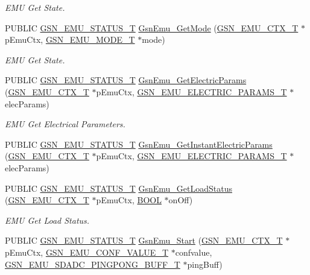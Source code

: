 \begin{DoxyCompactItemize}
\begin{DoxyCompactList}\small\item\em EMU Get State. \end{DoxyCompactList}\item 
PUBLIC \hyperlink{a00490_aeda27e2bd7f74b1b9748e313d272033e}{GSN\_\-EMU\_\-STATUS\_\-T} \hyperlink{a00663_ga04eb7d0e39bd40dc1e3b10be77de73ba}{GsnEmu\_\-GetMode} (\hyperlink{a00059}{GSN\_\-EMU\_\-CTX\_\-T} $\ast$pEmuCtx, \hyperlink{a00663_gafbaa4d30aa4b736f3465344d6a5935b0}{GSN\_\-EMU\_\-MODE\_\-T} $\ast$mode)
\begin{DoxyCompactList}\small\item\em EMU Get State. \end{DoxyCompactList}\item 
PUBLIC \hyperlink{a00490_aeda27e2bd7f74b1b9748e313d272033e}{GSN\_\-EMU\_\-STATUS\_\-T} \hyperlink{a00663_ga95c5ac4e1742d243bfa2722e75a01e73}{GsnEmu\_\-GetElectricParams} (\hyperlink{a00059}{GSN\_\-EMU\_\-CTX\_\-T} $\ast$pEmuCtx, \hyperlink{a00060}{GSN\_\-EMU\_\-ELECTRIC\_\-PARAMS\_\-T} $\ast$elecParams)
\begin{DoxyCompactList}\small\item\em EMU Get Electrical Parameters. \end{DoxyCompactList}\item 
PUBLIC \hyperlink{a00490_aeda27e2bd7f74b1b9748e313d272033e}{GSN\_\-EMU\_\-STATUS\_\-T} \hyperlink{a00489_a5599d53687aa801e24419e74c6a98f7a}{GsnEmu\_\-GetInstantElectricParams} (\hyperlink{a00059}{GSN\_\-EMU\_\-CTX\_\-T} $\ast$pEmuCtx, \hyperlink{a00060}{GSN\_\-EMU\_\-ELECTRIC\_\-PARAMS\_\-T} $\ast$elecParams)
\item 
PUBLIC \hyperlink{a00490_aeda27e2bd7f74b1b9748e313d272033e}{GSN\_\-EMU\_\-STATUS\_\-T} \hyperlink{a00663_ga600b62bce05579cdc2fd7d12b20c65df}{GsnEmu\_\-GetLoadStatus} (\hyperlink{a00059}{GSN\_\-EMU\_\-CTX\_\-T} $\ast$pEmuCtx, \hyperlink{a00660_ga1f04022c0a182c51c059438790ea138c}{BOOL} $\ast$onOff)
\begin{DoxyCompactList}\small\item\em EMU Get Load Status. \end{DoxyCompactList}\item 
PUBLIC \hyperlink{a00490_aeda27e2bd7f74b1b9748e313d272033e}{GSN\_\-EMU\_\-STATUS\_\-T} \hyperlink{a00663_gace908fb8fb14ee6186110f2641dbf072}{GsnEmu\_\-Start} (\hyperlink{a00059}{GSN\_\-EMU\_\-CTX\_\-T} $\ast$pEmuCtx, \hyperlink{a00058}{GSN\_\-EMU\_\-CONF\_\-VALUE\_\-T} $\ast$confvalue, \hyperlink{a00067}{GSN\_\-EMU\_\-SDADC\_\-PINGPONG\_\-BUFF\_\-T} $\ast$pingBuff)

\end{DoxyCompactItemize}
